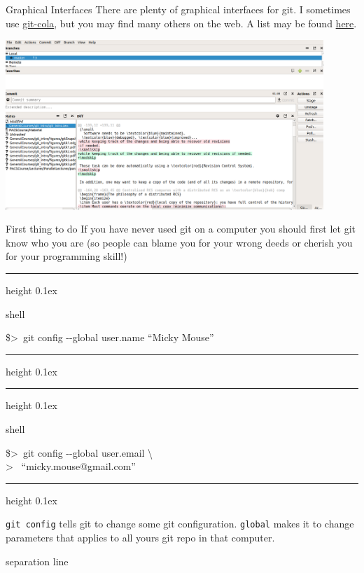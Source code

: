 \documentclass[hyperref={colorlinks}]{beamer}
\newenvironment{shell}{%
\footnotesize\flushleft\hrule height 0.1ex
\tt\begin{beamercolorbox}[sep=1ex,left]{shell}%
}{%
\end{beamercolorbox}
\hrule height 0.1ex
\endflushleft\par
}
\newcommand*{\psone}[1][ant]{\$>~}
\newcommand*{\nl}{\textbackslash\\>~}
\newcommand{\titleline}[1][0.025cm]{%
\begin{beamercolorbox}[wd=\paperwidth,ht=#1,center]{separation line}%
\end{beamercolorbox}%
}
\begin{document}
\begin{frame}{Graphical Interfaces}
There are plenty of graphical interfaces for git. I sometimes use \href{https://git-cola.github.io/}{git-cola}, but you may find many others on the web.
A list may be found \href{https://git-scm.com/download/gui/linux}{here}.

\medskip

\centerline{
\includegraphics[width=0.9\textwidth]{figures/gitcola}
}

\end{frame}
%
%

\begin{frame}{First thing to do}
If you have never used git on a computer you should first \alert{let git know who you are}  (so people can blame you for your wrong deeds or cherish you for your programming skill!)

\begin{shell}
\psone git config -{}-global user.name ``Micky Mouse''
\end{shell}
\begin{shell}
  \psone git config -{}-global user.email \nl
  ``micky.mouse@gmail.com''
\end{shell}

\texttt{git config} tells git to change some git configuration. 
\texttt{global} makes it to change parameters that applies to all yours git repo in that computer.  \titleline
\end{frame}
\end{document}
